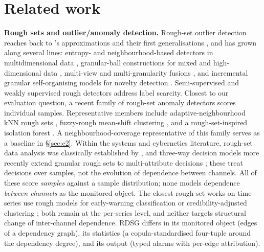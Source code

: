 \documentclass[11pt,a4paper]{article}
\newcommand{\RDSG}{RDSG}
\begin{document}
\section{Related work}\label{sec:related}

\textbf{Rough sets and outlier/anomaly detection.} Rough-set outlier
detection reaches back to \citet{pawlak1982}'s approximations and their first
generalisations \citep{dubois1990}, and has grown
along several lines: entropy- and neighbourhood-based detectors in
multidimensional data \citep{hu2008neighborhood,tsmc2022entropy}, granular-ball constructions for
mixed and high-dimensional data \citep{tkde2026granularball}, multi-view and
multi-granularity fusions \citep{ijar2025multiview}, and incremental granular
self-organising models for novelty detection \citep{ins2027granularsom}.
Semi-supervised and weakly supervised rough detectors
\citep{asoc2024consistency} address label scarcity. Closest to our evaluation
question, a recent family of rough-set anomaly detectors scores individual
samples. Representative members include adaptive-neighbourhood kNN rough sets
\citep{chen2025adknrs}, fuzzy-rough mean-shift clustering
\citep{liao2025fusing}, and a rough-set-inspired isolation forest
\citep{rachwal2025rsif}. A neighbourhood-coverage representative of this
family serves as a baseline in \S\ref{sec:e2}. Within the systems and
cybernetics literature, rough-set data analysis was classically established
by \citet{pawlak1998cs}, and three-way decision models more recently extend
granular rough sets to multi-attribute decisions
\citep{qiao2024threeway}; these treat decisions over samples, not the
evolution of dependence between channels. All of these score
\emph{samples} against a sample distribution; none models dependence
\emph{between channels} as the monitored object. The closest rough-set works
on time series use rough models for early-warning classification
\citep{scirep2026dynamic} or credibility-adjusted clustering
\citep{eswa2027credibility}; both remain at the per-series level, and neither
targets structural change of inter-channel dependence. \RDSG{} differs in its
monitored object (edges of a dependency graph), its statistics (a
copula-standardised four-tuple around the dependency degree), and its output
(typed alarms with per-edge attribution).
\end{document}
